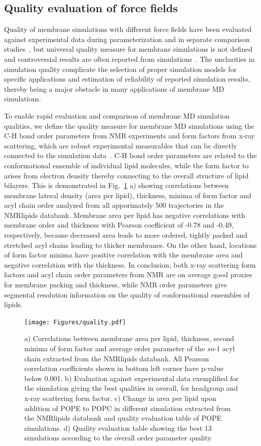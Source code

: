 \documentclass[fleqn,10pt]{wlscirep}
\begin{document}
\subsection{Quality evaluation of force fields}
Quality of membrane simulations with different force fields have been evaluated against experimental data during parameterization and in separate comparison studies~\cite{botan15,ollila16,catte16,pluhackova16,perez17,leonard19}, but universal quality measure for membrane simulations is not defined and controversial results are often reported from simulations~\cite{antila22b}. The unclarities in simulation quality complicate the selection of proper simulation models for specific applications and estimation of reliability of reported simulation results, thereby being a major obstacle in many applications of membrane MD simulations.

To enable rapid evaluation and comparison of membrane MD simulation qualities, we define the quality measure for membrane MD simulations using the C-H bond order parameters from NMR experiments and form factors from x-ray scattering, which are robust experimental measurables that can be directly connected to the simulation data~\cite{ollila16}. C-H bond order parameters are related to the conformational ensemble of individual lipid molecules, while the form factor to arises from electron density thereby connecting to the overall structure of lipid bilayers. This is demonstrated in Fig.~\ref{fig:quality} a) showing correlations between membrane lateral density (area per lipid), thickness, minima of form factor and acyl chain order analyzed from all apporimately 500 trajectories in the NMRlipids databank. Membrane area per lipid has negative correlations with membrane order and thickness with Pearson coefficient of -0.78 and -0.49, respectively, because decreased area leads to more ordered, tightly packed and stretched acyl chains leading to thicker membranes. On the other hand, locations of form factor minima have positive correlation with the membrane area and negative correlation with the thickness. In conclusion, both x-ray scattering form factors and acyl chain order parameters from NMR are on average good proxies for membrane packing and thickness, while NMR order parameters give segmental resolution information on the quality of conformational ensembles of lipids.

\begin{figure}[tbp]
    \centering
    \texttt{[image: Figures/quality.pdf]}
    \caption{a) Correlations between membrane area per lipid, thickness, second minima of form factor and average order parameter of the {\it sn}-1 acyl chain extracted from the NMRlipids databank. All Pearson correlation coefficients shown in bottom left corner have p-value below 0.001.
    b) Evaluation against experimental data exemplified for the simulation giving the best qualities in overall, for headgroup and x-ray scattering form factor.
    c) Change in area per lipid upon addition of POPE to POPC in different simulation extracted from the NMRlipids databank and quality evaluation table of POPE simulations.
    d) Quality evaluation table showing the best 13 simulations according to the overall order parameter quality.}
    \label{fig:quality}
\end{figure}
\end{document}
